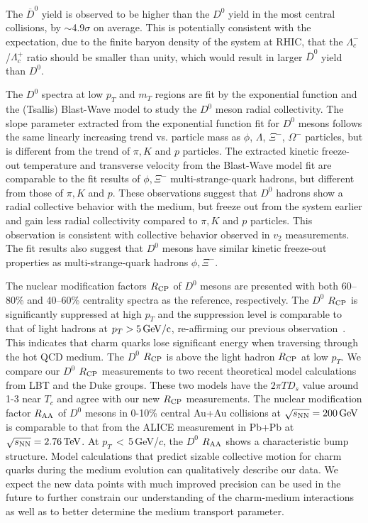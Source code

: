 \documentclass[%
 reprint,	
showpacs,
 amsmath,amssymb,
 aps,
 prc,
]{revtex4-1}
\providecommand{\DIFaddtex}[1]{{\protect\color{blue}\uwave{#1}}} %
\providecommand{\DIFaddbegin}{} %
\providecommand{\DIFaddend}{} %
\providecommand{\DIFadd}[1]{\texorpdfstring{\DIFaddtex{#1}}{#1}} %
\begin{document}
The $\overline{D}^{0}$ yield is observed to be higher than the $D^0$ yield in the most central collisions, by $\sim$\DIFaddbegin \DIFadd{\,}\DIFaddend 4.9$\sigma$ on average. This is potentially consistent with the expectation, due to the finite baryon density of the system at RHIC, that the $\Lambda_{c}^-$/$\Lambda_{c}^+$ ratio should be smaller than unity, which would result in larger $\overline{D}^{0}$ yield than $D^0$.

The $D^0$ spectra at low $p_{T}$ and $m_{T}$ regions are fit by the exponential function and the (Tsallis) Blast-Wave model to study the $D^0$ meson radial collectivity. The slope parameter extracted from the exponential function fit for $D^0$ mesons follows the same linearly increasing trend vs. particle mass as $\phi$, $\Lambda$, $\Xi^-$, $\Omega^-$ particles, but is different from the trend of $\pi,K$ and $p$ particles. The extracted kinetic freeze-out temperature and transverse velocity from the Blast-Wave model fit are comparable to the fit results of $\phi,\Xi^-$ multi-strange-quark hadrons, but different from those of $\pi,K$ and $p$.\,\,These observations suggest that $D^0$ hadrons show a radial collective behavior with the medium, but freeze out from the system earlier and gain less radial collectivity compared to $\pi,K$ and $p$ particles. This observation is consistent with collective behavior observed in $v_2$ measurements. The fit results also suggest that $D^0$ mesons have similar kinetic freeze-out properties as multi-strange-quark hadrons $\phi,\Xi^-$.

The nuclear modification factors $R_{\rm CP}$ of $D^0$ mesons are presented with both 60--80\% and 40--60\% centrality spectra as the reference, respectively. The $D^0$ $R_{\rm CP}$ is significantly suppressed at high $p_{T}$ and the suppression level is comparable to that of light hadrons at $p_{T}> 5\,\rm{GeV}/c$, re-affirming our previous observation~\cite{Star_D_RAA}. This indicates that charm quarks lose significant energy when traversing through the hot QCD medium. The $D^0$ $R_{\rm CP}$ is above the light hadron $R_{\rm CP}$ at low $p_{T}$. We compare our $D^0$ $R_{\rm CP}$ measurements to two recent theoretical model calculations from LBT and the Duke groups. These two models have the $2\pi TD_s$ value around 1-3 near $T_{c}$ and agree with our new $R_{\rm CP}$ measurements. The nuclear modification factor $R_{\rm AA}$ of $D^0$ mesons in 0-10\% central Au+Au collisions at ${\sqrt{s_{\rm NN}} = \rm{200\,GeV}}$ is comparable to that from the ALICE measurement in Pb+Pb at ${\sqrt{s_{\rm NN}} = \rm{2.76\,TeV}}$. At $p_{T}$\,$<$\,5\,GeV/$c$, the $D^0$ $R_{\rm AA}$ shows a characteristic bump structure. Model calculations that predict sizable collective motion for charm quarks during the medium evolution can qualitatively describe our data. We expect the new data points with much improved precision can be used in the future to further constrain our understanding of the charm-medium interactions as well as to better determine the medium transport parameter.
\end{document}
